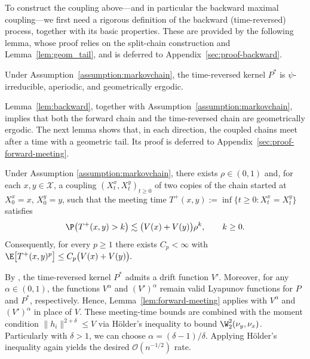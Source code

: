 \documentclass[mnsc,nonblindrev]{informs3}
\begin{document}
To construct the coupling above---and in particular the backward maximal
coupling---we first need a rigorous definition of the backward
(time-reversed) process, together with its basic properties. These are provided
by the following lemma, whose proof relies on the split-chain construction and
Lemma~\ref{lem:geom_tail}, and is deferred to
Appendix~\ref{sec:proof-backward}.
\begin{lemma}
\label{lem:backward}
Under Assumption~\ref{assumption:markovchain}, the time-reversed kernel $P^\ast$
is $\psi$-irreducible, aperiodic, and geometrically ergodic.
\end{lemma}
Lemma~\ref{lem:backward}, together with
Assumption~\ref{assumption:markovchain}, implies that both the forward chain
and the time-reversed chain are geometrically ergodic. The next lemma shows
that, in each direction, the coupled chains meet after a time with a geometric
tail. Its proof is deferred to Appendix~\ref{sec:proof-forward-meeting}.
\begin{lemma}
\label{lem:forward-meeting}
Under Assumption \ref{assumption:markovchain}, there exists $\rho \in(0,1)$ and,
for each $x,y\in\mathcal X$, a coupling $(X_t^x,X_t^y)_{t\ge0}$ of
two copies of the chain started at $X_0^x=x$, $X_0^y=y$, such that the
meeting time $T^+(x,y):=\inf\{t\ge0: X_t^x=X_t^y\}$ satisfies
\[
  \P\bigl(T^+(x,y)>k\bigr)
  \lesssim
  \bigl(V(x)+V(y)\bigr)\rho^k,
  \qquad k\ge0.
\]
Consequently, for every $p\ge1$ there exists $C_{p}<\infty$ with $  \E\bigl[T^+(x,y)^p\bigr]
  \le C_{p}\bigl(V(x)+V(y)\bigr).$
\end{lemma}
By \cite[Theorem~15.0.1]{Meyn12_book}, the time-reversed kernel \(P^\ast\)
admits a drift function \(V'\). Moreover, for any \(\alpha \in (0,1)\), the
functions \(V^\alpha\) and \((V')^\alpha\) remain valid Lyapunov functions for
\(P\) and \(P^\ast\), respectively. Hence,
Lemma~\ref{lem:forward-meeting} applies with \(V^\alpha\) and
\((V')^\alpha\) in place of \(V\). These meeting-time bounds are combined with the moment condition \(\|h_i\|^{2+\delta}\le V\) via H\"older's inequality to bound \(\W_2^2(\nu_y,\nu_x)\). Particularly with \(\delta>1\), we can choose \(\alpha = (\delta-1)/\delta\). Applying H\"older's inequality again yields the desired
\(\mathcal O(n^{-1/2})\) rate.
\end{document}
